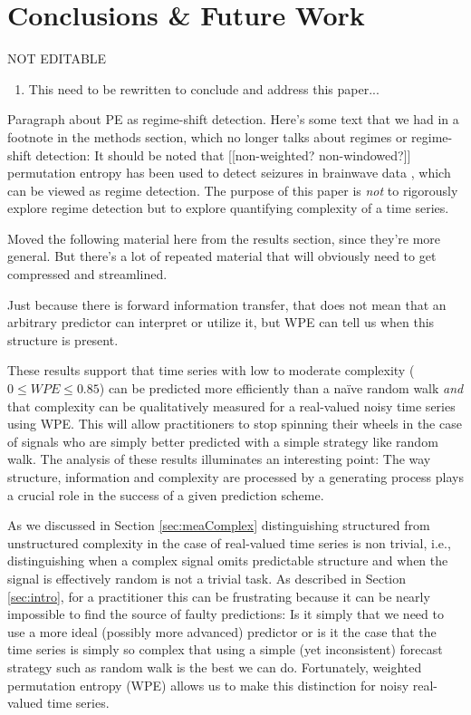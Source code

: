 \section{ Conclusions \& Future Work }\label{sec:conc}
{\color{red} NOT EDITABLE}
\begin{enumerate}
\item  This need to be rewritten to conclude and address this paper...
\end{enumerate}

Paragraph about PE as regime-shift detection.  Here's some text that
we had in a footnote in the methods section, which no longer talks
about regimes or regime-shift detection: It should be noted that
[[non-weighted?  non-windowed?]]  permutation entropy has been used to
detect seizures in brainwave data \cite{cao2004det}, which can be
viewed as regime detection.  The purpose of this paper is \emph{not}
to rigorously explore regime detection but to explore quantifying
complexity of a time series.

Moved the following material here from the results section, since
they're more general.  But there's a lot of repeated material that
will obviously need to get compressed and streamlined.

Just because there is forward information transfer, that does not mean
that an arbitrary predictor can interpret or utilize it, but WPE can
tell us when this structure is present.

These results support that time series with low to moderate complexity
($0\le WPE \le 0.85$) can be predicted more efficiently than a na\"ive
random walk \emph{and} that complexity can be qualitatively measured
for a real-valued noisy time series using WPE. This will allow
practitioners to stop spinning their wheels in the case of signals who
are simply better predicted with a simple strategy like random
walk. The analysis of these results illuminates an interesting point:
The way structure, information and complexity are processed by a
generating process plays a crucial role in the success of a given
prediction scheme.

As we discussed in Section \ref{sec:meaComplex} distinguishing
structured from unstructured complexity in the case of real-valued
time series is non trivial, i.e., distinguishing when a complex signal
omits predictable structure and when the signal is effectively random
is not a trivial task. As described in Section \ref{sec:intro}, for a
practitioner this can be frustrating because it can be nearly
impossible to find the source of faulty predictions: Is it simply that
we need to use a more ideal (possibly more advanced) predictor or is
it the case that the time series is simply so complex that using a
simple (yet inconsistent) forecast strategy such as random walk is the
best we can do. Fortunately, weighted permutation entropy (WPE) allows
us to make this distinction for noisy real-valued time series.

